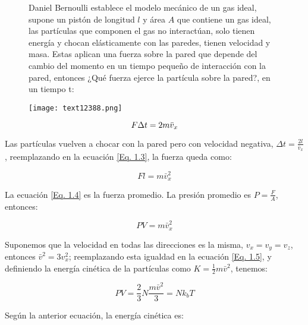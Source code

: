 \documentclass[11pt,fleqn]{book}
\begin{document}
\begin{figure}[H]
    \begin{minipage}[c]{0.6\linewidth}
    \hspace{5mm} Daniel Bernoulli establece el modelo mecánico de un gas ideal, supone un pistón de longitud $l$ y área $A$ que contiene un gas ideal, las partículas que componen el gas no interactúan, solo tienen energía y chocan elásticamente con las paredes, tienen velocidad y masa. Estas aplican una fuerza sobre la pared que depende del cambio del momento en un tiempo pequeño de interacción con la pared, entonces ¿Qué fuerza ejerce la partícula sobre la pared?, en un tiempo t:
    \end{minipage}\hspace{1cm}
    \begin{minipage}[c]{0.5\linewidth}
    \texttt{[image: text12388.png]}
    \end{minipage}
\end{figure}
\vspace{-9mm} 

\begin{equation}
    F \Delta t =2m\Bar{v}_{x}
    \label{Eq. 1.3}
\end{equation}

Las partículas vuelven a chocar con la pared pero con velocidad negativa, $\Delta t = \frac{2l}{\bar{v}_{x}}$, reemplazando en la ecuación \ref{Eq. 1.3}, la fuerza queda como:

\begin{equation}
   Fl=m\bar{v}_{x}^{2}
   \label{Eq. 1.4}
\end{equation}

La ecuación \ref{Eq. 1.4} es la fuerza promedio. La presión promedio es $P=\frac{F}{A}$, entonces:

\begin{equation}
PV=m\bar{v}_{x}^{2}
\label{Eq. 1.5}
\end{equation}

Suponemos que la velocidad en todas las direcciones es la misma, $v_{x}=v_{y}=v_{z}$, entonces $\bar{v}^{2}=3v_{x}^{2}$; reemplazando esta igualdad en la ecuación \ref{Eq. 1.5}, y definiendo la energía cinética de la partículas como $K=\frac{1}{2}m\bar{v}^{2}$, tenemos:

\begin{equation}
    PV=\frac{2}{3}N\frac{m\bar{v}^{2}}{3}=Nk_{b}T
    \label{Eq. 1.6}
\end{equation}

Según la anterior ecuación, la energía cinética es:
\end{document}
